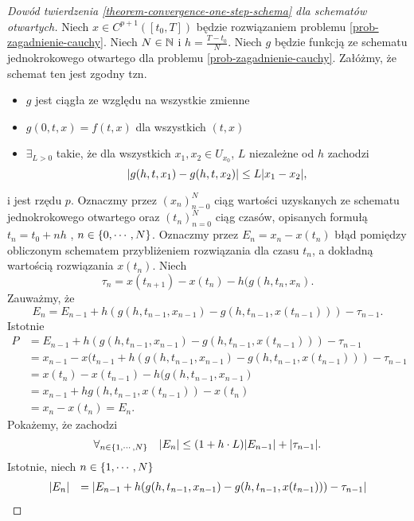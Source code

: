 \documentclass[12pt,a4paper]{report}
\begin{document}
\begin{proof}[Dowód twierdzenia \ref{theorem-convergence-one-step-schema} dla schematów otwartych]
Niech $ x \in C^{p+1}([t_0,T]) $ będzie rozwiązaniem problemu \ref{prob-zagadnienie-cauchy}. Niech $ N \in \mathbb{N} $ i $ h = \frac{T-t_0}{N} $. Niech $g$ będzie funkcją ze schematu jednokrokowego otwartego dla problemu \ref{prob-zagadnienie-cauchy}. Załóżmy, że schemat ten jest zgodny tzn. 
\begin{itemize}
\item $g$ jest ciągła ze względu na wszystkie zmienne 
\item $ g(0,t,x) = f(t,x)$ dla wszystkich $ (t,x) $
\item $ \exists_{L>0} $ takie, że dla wszystkich $x_1 , x_2 \in U_{x_{0}} $, $L$ niezależne od $h$ zachodzi
$$
{\left| {g(h,t,x_1) - g(h,t,x_2)} \right|} \leq L  {\left| {x_1 - x_2} \right|} ,
$$
\end{itemize}
i jest rzędu $p$. 
Oznaczmy przez $ (x_n)_{n-0}^{N} $ ciąg wartości uzyskanych ze schematu jednokrokowego otwartego oraz $(t_n)_{n=0}^{N}$ ciąg czasów, opisanych formułą $ t_n = t_0 + nh $ , $ n \in \left\lbrace {0, \cdots, N} \right\rbrace $. Oznaczmy przez $E_n = x_n - x(t_n)$ błąd pomiędzy obliczonym schematem przybliżeniem rozwiązania dla czasu $t_n$, a dokładną wartością rozwiązania $x(t_n)$. Niech 
$$
\tau_n = x(t_{n+1}) - x(t_n) - h(g(h,t_n,x_n).
$$ Zauważmy, że 
$$
E_n = E_{n-1} + h(g(h,t_{n-1},x_{n-1}) - g(h,t_{n-1},x(t_{n-1}))) - \tau_{n-1}. 
$$ 
Istotnie
\begin{equation}
\begin{array}{rl}
P &= E_{n-1} + h(g(h,t_{n-1},x_{n-1}) - g(h,t_{n-1},x(t_{n-1}))) - \tau_{n-1} \\
 &= x_{n-1} - x(t_{n-1} + h(g(h,t_{n-1},x_{n-1}) - g(h,t_{n-1},x(t_{n-1}))) - \tau_{n-1} \\
 &= x(t_{n}) - x(t_{n-1}) - h(g(h,t_{n-1},x_{n-1}) \\
 &= x_{n-1} + hg(h,t_{n-1},x(t_{n-1})) - x(t_n) \\
 &= x_n - x(t_n) = E_n .
\end{array}
\end{equation} 
Pokażemy, że zachodzi 
\begin{equation} \label{proof1}
\forall_{n \in \left\lbrace {1,\cdots,N} \right\rbrace} \quad  {\left| {E_n} \right|} \leq (1 + h \cdot L) {\left| {E_{n-1}} \right|} + {\left| {\tau_{n-1}} \right|} .
\end{equation}
Istotnie, niech $n \in \left\lbrace {1,\cdots,N} \right\rbrace $ 
\begin{equation}
\begin{array}{rl}
{\left| {E_n} \right|} &= {\left| {E_{n-1} + h(g(h,t_{n-1},x_{n-1}) - g(h,t_{n-1},x(t_{n-1}))) - \tau_{n-1}} \right|} \\

\end{array}
\end{equation}
\end{proof}
\end{document}
